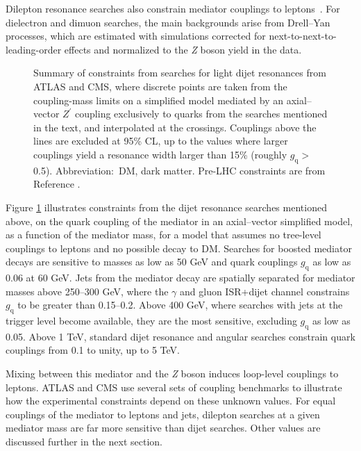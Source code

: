 \documentclass{ar-1col}
\newcommand{\gq}{$g_{\mathrm{q}}$\xspace}
\begin{document}
Dilepton resonance searches also constrain mediator couplings to
leptons~\cite{Aaboud:2017buh,Khachatryan:2016zqb}. For dielectron
and dimuon searches, the main backgrounds arise from Drell--Yan
processes, which are estimated with simulations corrected for next-to-next-to-leading-order
effects and normalized to the \textit{Z} boson yield in the data.

\begin{figure}[!htpb]
\caption{Summary of constraints from searches for light dijet
resonances from ATLAS and CMS, where discrete points are taken
from the coupling-mass limits on a simplified model mediated by an
axial--vector $Z^\prime$ coupling exclusively to quarks from the
searches mentioned in the text, and interpolated at the crossings.
Couplings above the lines are excluded at 95\% CL, up to the
values where larger couplings yield a resonance width larger than
15\% (roughly \gq $>$ 0.5). Abbreviation:\ DM, dark matter. Pre-LHC constraints are from Reference .}\label{fig:couplingmass}
\end{figure}

Figure \ref{fig:couplingmass} illustrates constraints from the
dijet resonance searches mentioned above, on the quark coupling of
the mediator in an axial--vector simplified model, as a function of
the mediator mass, for a model that assumes no tree-level
couplings to leptons and no possible decay to DM. Searches for
boosted mediator decays are sensitive to masses as low as 50 GeV
and quark couplings \gq as low as 0.06 at 60 GeV. Jets from the
mediator decay are spatially separated for mediator masses above
250--300 GeV, where the $\gamma$ and gluon ISR+dijet channel
constrains \gq to be greater than 0.15--0.2. Above 400 GeV, where searches with
jets at the trigger level become available, they are the most
sensitive, excluding \gq as low as 0.05. Above 1 TeV, standard
dijet resonance and angular searches constrain quark couplings
from 0.1 to unity, up to 5 TeV.

Mixing between this mediator and the \textit{Z} boson induces loop-level
couplings to leptons. ATLAS and CMS use several sets of coupling
benchmarks to illustrate how the experimental constraints depend
on these unknown values. For equal couplings of the mediator to
leptons and jets, dilepton searches at a given mediator mass are
far more sensitive than dijet searches. Other values are
discussed further in the next section.
\end{document}
